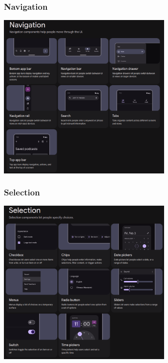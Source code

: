 \documentclass[12pt]{beamer}
\begin{document}
	\begin{frame}
        \frametitle{Navigation}
    
        \begin{center}

            \includegraphics[width=0.65\textwidth]{navigation.png}

        \end{center}
    
    \end{frame}

    \begin{frame}
        \frametitle{Selection}
    
        \begin{center}

            \includegraphics[width=0.65\textwidth]{selection.png}

        \end{center}
    
    \end{frame}
\end{document}
